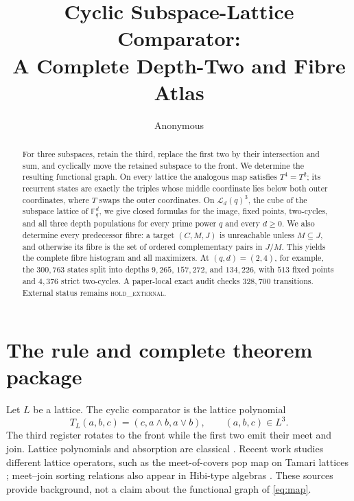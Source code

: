 \documentclass[a4paper,10pt]{amsart}
\title[Cyclic subspace-lattice comparator]{Cyclic Subspace-Lattice Comparator:\\
A Complete Depth-Two and Fibre Atlas}
\author{Anonymous}
\date{}
\theoremstyle{remark}
\newcommand{\F}{\mathbb F}
\newcommand{\cL}{\mathcal L}
\begin{document}
\begin{abstract}
For three subspaces, retain the third, replace the first two by their
intersection and sum, and cyclically move the retained subspace to the front.
We determine the resulting functional graph.  On every lattice the analogous
map satisfies $T^4=T^2$; its recurrent states are exactly the triples whose
middle coordinate lies below both outer coordinates, where $T$ swaps the
outer coordinates.  On $\cL_d(q)^3$, the cube of the subspace lattice of
$\F_q^d$, we give closed formulas for the image, fixed points, two-cycles, and
all three depth populations for every prime power $q$ and every $d\ge0$.
We also determine every predecessor fibre: a target $(C,M,J)$ is unreachable
unless $M\subseteq J$, and otherwise its fibre is the set of ordered
complementary pairs in $J/M$.  This yields the complete fibre histogram and
all maximizers.  At $(q,d)=(2,4)$, for example, the $300{,}763$ states split
into depths $9{,}265$, $157{,}272$, and $134{,}226$, with $513$ fixed points
and $4{,}376$ strict two-cycles.  A paper-local exact audit checks $328{,}700$
transitions.  External status remains \textsc{hold\_external}.
\end{abstract}

\maketitle

\section{The rule and complete theorem package}

Let $L$ be a lattice.  The cyclic comparator is the lattice polynomial
\begin{equation}\label{eq:map}
        T_L(a,b,c)=(c,a\wedge b,a\vee b),\qquad (a,b,c)\in L^3.
\end{equation}
The third register rotates to the front while the first two emit their meet
and join.  Lattice polynomials and absorption are classical
\cite{Birkhoff1967}.  Recent work studies different lattice operators, such
as the meet-of-covers pop map on Tamari lattices \cite{Hong2022}; meet--join
sorting relations also appear in Hibi-type algebras
\cite{GasanovaNicklasson2024}.  These sources provide background, not a claim
about the functional graph of \eqref{eq:map}.
\end{document}

